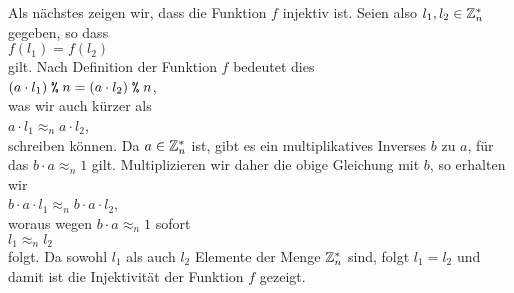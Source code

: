 Als n\"{a}chstes zeigen wir, dass die Funktion $f$ injektiv ist.  Seien also $l_1, l_2 \in \mathbb{Z}_{n}^*$
gegeben, so dass
\\[0.2cm]
\hspace*{1.3cm}
$f(l_1) = f(l_2)$
\\[0.2cm]
gilt.  Nach Definition der Funktion $f$ bedeutet dies
\\[0.2cm]
\hspace*{1.3cm}
$(a \cdot l_1) \;\texttt{\%}\; n = (a \cdot l_2) \;\texttt{\%}\; n$, 
\\[0.2cm]
was wir auch k\"{u}rzer als
\\[0.2cm]
\hspace*{1.3cm}
$a \cdot l_1 \approx_n a \cdot l_2$, 
\\[0.2cm]
schreiben k\"{o}nnen.  Da $a \in \mathbb{Z}_{n}^*$ ist, gibt es ein multiplikatives Inverses $b$ zu $a$, f\"{u}r das
$b \cdot a \approx_n 1$ gilt.  Multiplizieren wir daher die obige Gleichung mit $b$, so erhalten wir
\\[0.2cm]
\hspace*{1.3cm}
$b \cdot a \cdot l_1 \approx_n b \cdot a \cdot l_2$, 
\\[0.2cm] 
woraus wegen $b \cdot a \approx_n 1$ sofort
\\[0.2cm]
\hspace*{1.3cm}
$l_1 \approx_n l_2$ 
\\[0.2cm]
folgt.  Da sowohl $l_1$ als auch $l_2$ Elemente der Menge $\mathbb{Z}_{n}^*$ sind, folgt $l_1 = l_2$ und
damit ist die Injektivit\"{a}t der Funktion $f$ gezeigt.
\vspace*{0.3cm}


